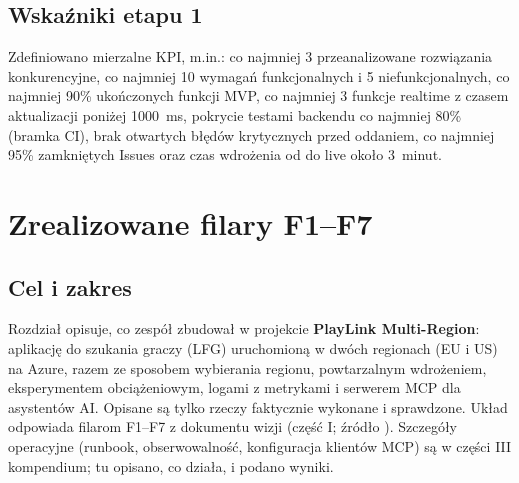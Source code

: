 \section{Wskaźniki etapu 1}
Zdefiniowano mierzalne KPI, m.in.: co najmniej 3 przeanalizowane rozwiązania konkurencyjne, co najmniej
10 wymagań funkcjonalnych i 5 niefunkcjonalnych, co najmniej 90\% ukończonych funkcji MVP, co najmniej
3 funkcje realtime z czasem aktualizacji poniżej 1000~ms, pokrycie testami backendu co najmniej 80\%
(bramka CI), brak otwartych błędów krytycznych przed oddaniem, co najmniej 95\% zamkniętych Issues oraz
czas wdrożenia od  do live około 3~minut.

\chapter{Zrealizowane filary F1--F7}\label{ch:real-filary}

\section{Cel i zakres}
Rozdział opisuje, co zespół zbudował w projekcie \textbf{PlayLink Multi-Region}: aplikację do szukania
graczy (LFG) uruchomioną w dwóch regionach (EU i US) na Azure, razem ze sposobem wybierania regionu,
powtarzalnym wdrożeniem, eksperymentem obciążeniowym, logami z metrykami i serwerem MCP dla asystentów AI.
Opisane są tylko rzeczy faktycznie wykonane i sprawdzone. Układ odpowiada filarom F1--F7 z dokumentu wizji
(część I; źródło ). Szczegóły operacyjne (runbook, obserwowalność, konfiguracja
klientów MCP) są w części III kompendium; tu opisano, co działa, i podano wyniki.

